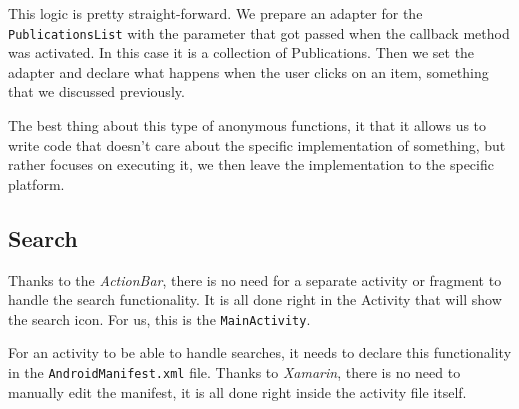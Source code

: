 This logic is pretty straight-forward. We prepare an adapter for the \texttt{PublicationsList} with the parameter that got passed when the callback method was activated. In this case it is a collection of Publications. Then we set the adapter and declare what happens when the user clicks on an item, something that we discussed previously.

The best thing about this type of anonymous functions, it that it allows us to write code that doesn't care about the specific implementation of something, but rather focuses on executing it, we then leave the implementation to the specific platform.



\subsection{Search}

Thanks to the \textit{ActionBar}, there is no need for a separate activity or fragment to handle the search functionality. It is all done right in the Activity that will show the search icon. For us, this is the \texttt{MainActivity}.

For an activity to be able to handle searches, it needs to declare this functionality in the \texttt{AndroidManifest.xml} file. Thanks to \textit{Xamarin}, there is no need to manually edit the manifest, it is all done right inside the activity file itself. 

